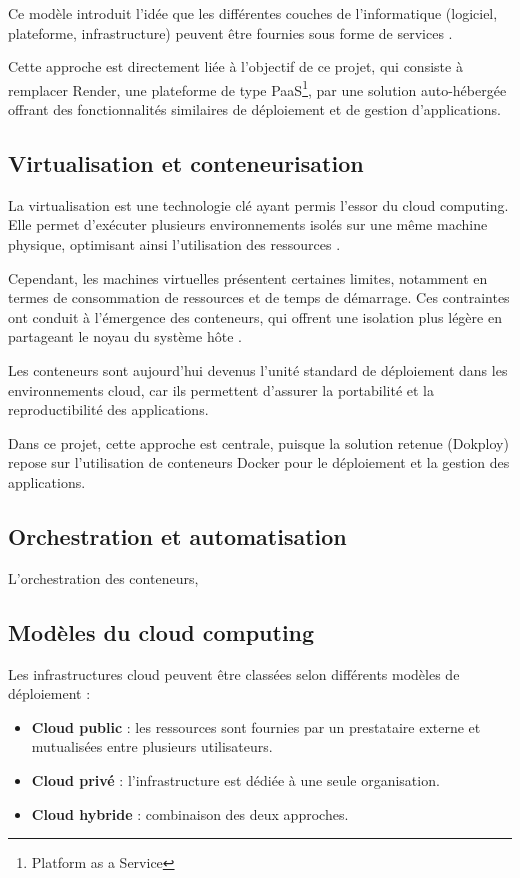 \documentclass{rapportClass} %
\begin{document}
Ce modèle introduit l’idée que les différentes couches de
l’informatique (logiciel, plateforme, infrastructure) peuvent être
fournies sous forme de services \cite{NIST2026}.

Cette approche est directement liée à l’objectif de ce projet, qui
consiste à remplacer Render, une plateforme de type PaaS\footnote{Platform as a Service}, par une
solution auto-hébergée offrant des fonctionnalités similaires de
déploiement et de gestion d’applications.

\subsection{Virtualisation et conteneurisation}

La virtualisation est une technologie clé ayant permis
l’essor du cloud computing. Elle permet d’exécuter plusieurs
environnements isolés sur une même machine physique, optimisant ainsi
l’utilisation des ressources \cite{VMware2007}.

Cependant, les machines virtuelles présentent certaines limites,
notamment en termes de consommation de ressources et de temps de
démarrage. Ces contraintes ont conduit à l’émergence des conteneurs,
qui offrent une isolation plus légère en partageant le noyau du
système hôte \cite{Merkel2014}.

Les conteneurs sont aujourd’hui devenus l’unité standard de déploiement
dans les environnements cloud, car ils permettent d’assurer la
portabilité et la reproductibilité des applications.

Dans ce projet, cette approche est centrale, puisque la solution
retenue (Dokploy) repose sur l’utilisation de conteneurs Docker pour
le déploiement et la gestion des applications.

\subsection{Orchestration et automatisation}
L’orchestration des conteneurs, 

\subsection{Modèles du cloud computing}

Les infrastructures cloud peuvent être classées selon différents
modèles de déploiement :

\begin{itemize}[label=$\bullet$] 
\item \textbf{Cloud public} : les ressources sont fournies par un
prestataire externe et mutualisées entre plusieurs utilisateurs.
\item \textbf{Cloud privé} : l’infrastructure est dédiée à une seule
organisation.
\item \textbf{Cloud hybride} : combinaison des deux approches.
\end{itemize}
\end{document}

